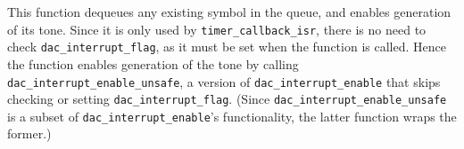 \documentclass[11pt,a4paper,twocolumn]{scrartcl}
\begin{document}
This function dequeues any existing symbol in the queue, and enables generation of its tone. Since it is only used by \verb!timer_callback_isr!, there is no need to check \verb!dac_interrupt_flag!, as it must be set when the function is called. Hence the function enables generation of the tone by calling \verb!dac_interrupt_enable_unsafe!, a version of \verb!dac_interrupt_enable! that skips checking or setting \verb!dac_interrupt_flag!. (Since \verb!dac_interrupt_enable_unsafe! is a subset of \verb!dac_interrupt_enable!'s functionality, the latter function wraps the former.) 

%
%
%
%
%
\end{document}
